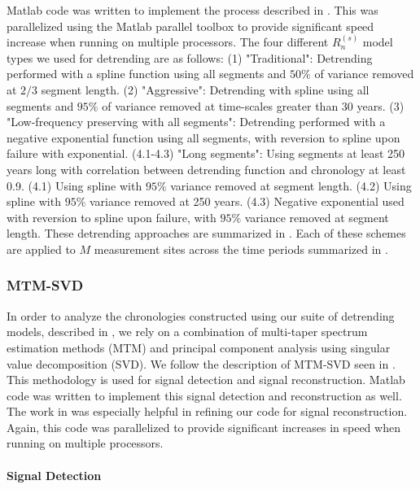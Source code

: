 \documentclass[phd,tocprelim]{cornell}
\newcommand{\myparagraph}[1]{\paragraph{#1}\mbox{}\\\mbox{}\\}
\begin{document}
\par
Matlab code was written to implement the process described in 
. This was parallelized using the Matlab parallel 
toolbox to provide significant speed increase when running on 
multiple processors. The four different $R_n^{(s)}$ model types we 
used for detrending are as follows: (1) "Traditional": Detrending 
performed with a spline function using all segments and $50\%$ of 
variance removed at $2/3$ segment length. (2) "Aggressive": 
Detrending with spline using all segments and $95\%$ of variance 
removed at time-scales greater than 30 years. (3) "Low-frequency 
preserving with all segments": Detrending performed with a negative 
exponential function using all segments, with reversion to spline 
upon failure with exponential. (4.1-4.3) "Long segments": Using segments 
at least 250 years long with correlation between detrending function 
and chronology at least 0.9. (4.1) Using spline with $95\%$ variance 
removed at segment length. (4.2) Using spline with $95\%$ variance 
removed at 250 years. (4.3) Negative exponential used with reversion 
to spline upon failure, with $95\%$ variance removed at segment length. 
These detrending approaches are summarized in . 
Each of these schemes are applied to $M$ measurement sites across 
the time periods summarized in .

  
\subsubsection{MTM-SVD}\label{mtmsvd}
In order to analyze the chronologies constructed using our suite of 
detrending models, described in , we rely on 
a combination of multi-taper spectrum estimation methods (MTM) and 
principal component analysis using singular value decomposition (SVD). 
We follow the description of MTM-SVD seen in \cite{mann1999oscillatory}. 
This methodology is used for signal detection and signal reconstruction. 
Matlab code was written to implement this signal detection and 
reconstruction as well. The work in \cite{correa2012multitaper} was 
especially helpful in refining our code for signal reconstruction. 
Again, this code was parallelized to provide significant increases 
in speed when running on multiple processors. 

\myparagraph{Signal Detection}\label{sig:det}
\end{document}
